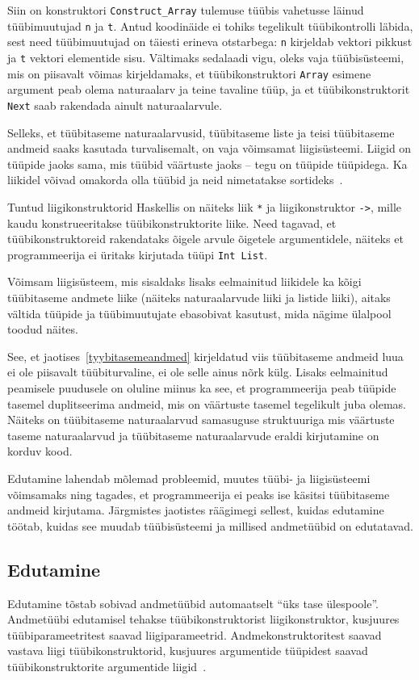 \documentclass[12pt]{article}
\begin{document}
      Siin on konstruktori \verb!Construct_Array! tulemuse tüübis vahetusse läinud tüübimuutujad \verb!n! ja \verb!t!. Antud koodinäide ei tohiks tegelikult tüübikontrolli läbida, sest need tüübimuutujad on täiesti erineva otstarbega: \verb!n! kirjeldab vektori pikkust ja \verb!t! vektori elementide sisu. Vältimaks sedalaadi vigu, oleks vaja tüübisüsteemi, mis on piisavalt võimas kirjeldamaks, et tüübikonstruktori \verb!Array! esimene argument peab olema naturaalarv ja teine tavaline tüüp, ja et tüübikonstruktorit \verb!Next! saab rakendada ainult naturaalarvule.

      Selleks, et tüübitaseme naturaalarvusid, tüübitaseme liste ja teisi tüübitaseme andmeid saaks kasutada turvalisemalt, on vaja võimsamat liigisüsteemi. Liigid on tüüpide jaoks sama, mis tüübid väärtuste jaoks -- tegu on tüüpide tüüpidega. Ka liikidel võivad omakorda olla tüübid ja neid nimetatakse sortideks~\cite{Typ}.

      Tuntud liigikonstruktorid Haskellis on näiteks liik \verb!*! ja liigikonstruktor \verb!->!, mille kaudu konstrueeritakse tüübikonstruktorite liike. Need tagavad, et tüübikonstruktoreid rakendataks õigele arvule õigetele argumentidele, näiteks et programmeerija ei üritaks kirjutada tüüpi \verb!Int List!.

      Võimsam liigisüsteem, mis sisaldaks lisaks eelmainitud liikidele ka kõigi tüübitaseme andmete liike (näiteks naturaalarvude liiki ja listide liiki), aitaks vältida tüüpide ja tüübimuutujate ebasobivat kasutust, mida nägime ülalpool toodud näites.

      See, et jaotises~\ref{tyybitasemeandmed} kirjeldatud viis tüübitaseme andmeid luua ei ole piisavalt tüübiturvaline, ei ole selle ainus nõrk külg. Lisaks eelmainitud peamisele puudusele on oluline miinus ka see, et programmeerija peab tüüpide tasemel duplitseerima andmeid, mis on väärtuste tasemel tegelikult juba olemas. Näiteks on tüübitaseme naturaalarvud samasuguse struktuuriga mis väärtuste taseme naturaalarvud ja tüübitaseme naturaalarvude eraldi kirjutamine on korduv kood.

      Edutamine lahendab mõlemad probleemid, muutes tüübi- ja liigisüsteemi võimsamaks ning tagades, et programmeerija ei peaks ise käsitsi tüübitaseme andmeid kirjutama. Järgmistes jaotistes räägimegi sellest, kuidas edutamine töötab, kuidas see muudab tüübisüsteemi ja millised andmetüübid on edutatavad.
    \subsection{Edutamine}
      Edutamine tõstab sobivad andmetüübid automaatselt "`üks tase ülespoole"'. Andmetüübi edutamisel tehakse tüübikonstruktorist liigikonstruktor, kusjuures tüübiparameetritest saavad liigiparameetrid. Andmekonstruktoritest saavad vastava liigi tüübikonstruktorid, kusjuures argumentide tüüpidest saavad tüübikonstruktorite argumentide liigid~\cite{Giv}.
\end{document}
